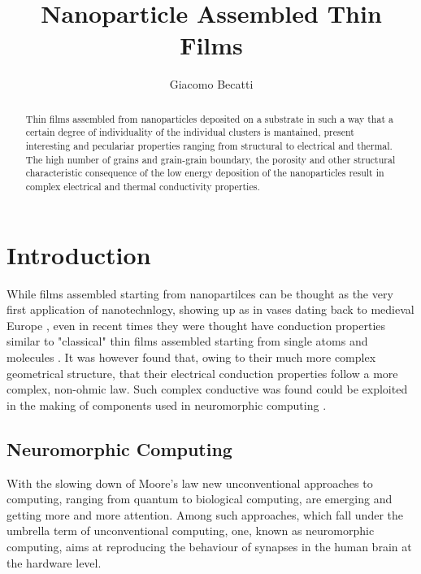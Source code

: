 \documentclass[11pt,a4paper]{article}
\author{Giacomo Becatti}
\title{Nanoparticle Assembled Thin Films}
\begin{document}
\maketitle
\begin{abstract}
Thin films assembled from nanoparticles deposited on a substrate in such a way that a certain degree of individuality of the individual clusters is mantained, present interesting and peculariar properties ranging from structural to electrical and thermal. The high number of grains and grain-grain boundary, the porosity and other structural characteristic consequence of the low energy deposition of the nanoparticles result in complex electrical and thermal conductivity properties.
\end{abstract}
\section{Introduction}
While films assembled starting from nanopartilces can be thought as the very first application of nanotechnlogy, showing up as  in vases dating back to medieval Europe \cite{heterogeneous_borgia_2002}, even in recent times they were thought have conduction properties similar to "classical" thin films assembled starting from single atoms and molecules \cite{electrical_mirigliano_2021}. It was however found that, owing to their much more complex geometrical structure, that their electrical \cite{nonohmic_mirigliano_2019}\cite{electrical_mirigliano_2021} conduction properties follow a more complex, non-ohmic law. Such complex conductive was found could be exploited in the making of components used in neuromorphic computing \cite{binary_mirigliano_2021}.
\subsection{Neuromorphic Computing}
With the slowing down of Moore's law new unconventional approaches to computing, ranging from quantum to biological computing, are emerging and getting more and more attention. Among such approaches, which fall under the umbrella term of unconventional computing, one, known as neuromorphic computing, aims at reproducing the behaviour of synapses in the human brain at the hardware level.



\end{document}

